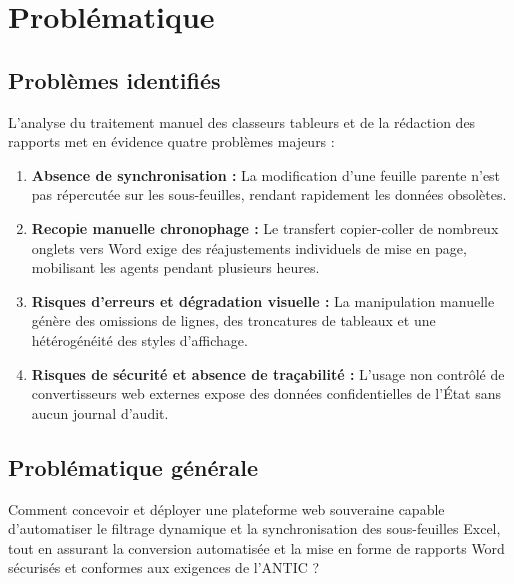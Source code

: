 \chapter{Problématique}

\section{Problèmes identifiés}

L'analyse du traitement manuel des classeurs tableurs et de la rédaction des rapports met en évidence quatre problèmes majeurs :

\begin{enumerate}
    \item \textbf{Absence de synchronisation :} La modification d'une feuille parente n'est pas répercutée sur les sous-feuilles, rendant rapidement les données obsolètes.
    \item \textbf{Recopie manuelle chronophage :} Le transfert copier-coller de nombreux onglets vers Word exige des réajustements individuels de mise en page, mobilisant les agents pendant plusieurs heures.
    \item \textbf{Risques d'erreurs et dégradation visuelle :} La manipulation manuelle génère des omissions de lignes, des troncatures de tableaux et une hétérogénéité des styles d'affichage.
    \item \textbf{Risques de sécurité et absence de traçabilité :} L'usage non contrôlé de convertisseurs web externes expose des données confidentielles de l'État sans aucun journal d'audit.
\end{enumerate}

\section{Problématique générale}

Comment concevoir et déployer une plateforme web souveraine capable d'automatiser le filtrage dynamique et la synchronisation des sous-feuilles Excel, tout en assurant la conversion automatisée et la mise en forme de rapports Word sécurisés et conformes aux exigences de l'ANTIC ?
